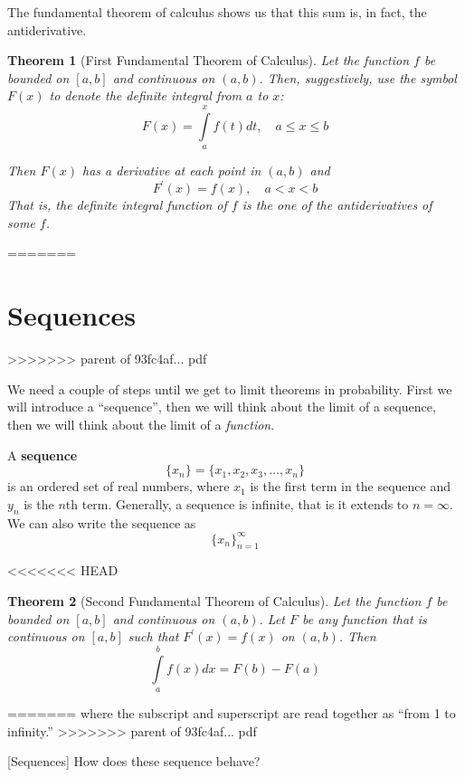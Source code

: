 \documentclass[]{book}
\newtheorem{theorem}{Theorem}[chapter]
\theoremstyle{definition}
\theoremstyle{definition}
\theoremstyle{definition}
\theoremstyle{remark}
\begin{document}
The fundamental theorem of calculus shows us that this sum is, in fact, the antiderivative.

\begin{theorem}[First Fundamental Theorem of Calculus]
\protect\hypertarget{thm:unnamed-chunk-27}{}{\label{thm:unnamed-chunk-27} {} }Let the function \(f\) be bounded on \([a,b]\) and continuous on \((a,b)\). Then, suggestively, use the symbol \(F(x)\) to denote the definite integral from \(a\) to \(x\):
\[F(x)=\int\limits_a^x f(t)dt, \quad a\le x\le b\]

Then \(F(x)\) has a derivative at each point in \((a,b)\) and \[F^\prime(x)=f(x), \quad a<x<b\]
That is, the definite integral function of \(f\) \emph{is} the one of the antiderivatives of some \(f\).
\end{theorem}
=======
\hypertarget{sequences}{%
\section{Sequences}\label{sequences}}
>>>>>>> parent of 93fc4af... pdf

We need a couple of steps until we get to limit theorems in probability. First we will introduce a ``sequence'', then we will think about the limit of a sequence, then we will think about the limit of a \emph{function}.

A \textbf{sequence} \[\{x_n\}=\{x_1, x_2, x_3, \ldots, x_n\}\] is an ordered set of real numbers, where \(x_1\) is the first term in the sequence and \(y_n\) is the \(n\)th term. Generally, a sequence is infinite, that is it extends to \(n=\infty\). We can also write the sequence as \[\{x_n\}^\infty_{n=1}\]

<<<<<<< HEAD
\begin{theorem}[Second Fundamental Theorem of Calculus]
\protect\hypertarget{thm:unnamed-chunk-28}{}{\label{thm:unnamed-chunk-28} {} }Let the function \(f\) be bounded on \([a,b]\) and continuous on \((a,b)\). Let \(F\) be any function that is continuous on \([a,b]\) such that \(F^\prime(x)=f(x)\) on \((a,b)\). Then \[\int\limits_a^bf(x)dx = F(b)-F(a)\]
\end{theorem}
=======
where the subscript and superscript are read together as ``from 1 to infinity.''
>>>>>>> parent of 93fc4af... pdf

[Sequences]
\protect\hypertarget{exm:seqbehav}{}{\label{exm:seqbehav} {} }
How does these sequence behave?
\end{document}
